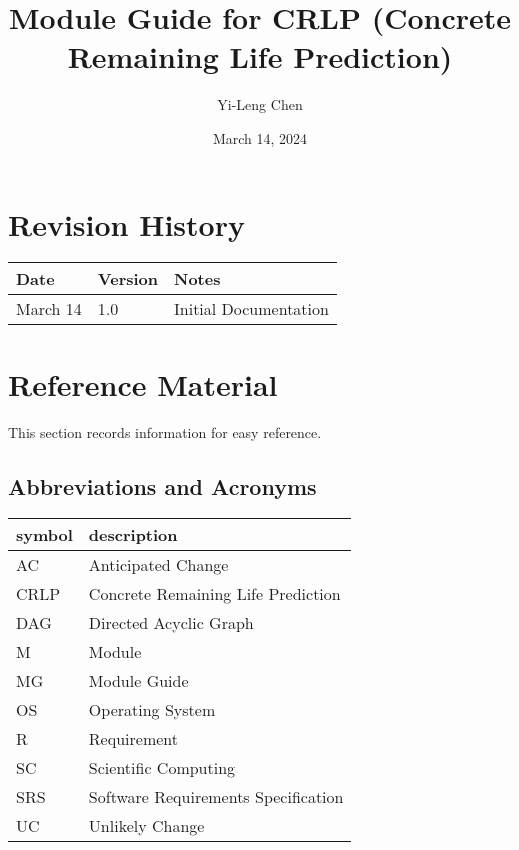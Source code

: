 \documentclass[12pt, titlepage]{article}
\begin{document}
\title{Module Guide for CRLP (Concrete Remaining Life Prediction)}
\author{Yi-Leng Chen}
\date{March 14, 2024}

\maketitle
{}

\section{Revision History}

\begin{tabularx}{\textwidth}{p{3cm}p{2cm}X}
\toprule {\bf Date} & {\bf Version} & {\bf Notes}\\
\midrule
March 14 & 1.0 & Initial Documentation\\
\bottomrule
\end{tabularx}

\newpage

\section{Reference Material}

This section records information for easy reference.

\subsection{Abbreviations and Acronyms}

\renewcommand{\arraystretch}{1.2}
\begin{tabular}{l l} 
  \toprule		
  \textbf{symbol} & \textbf{description}\\
  \midrule 
  AC & Anticipated Change\\
  CRLP & Concrete Remaining Life Prediction \\
  DAG & Directed Acyclic Graph \\
  M & Module \\
  MG & Module Guide \\
  OS & Operating System \\
  R & Requirement\\
  SC & Scientific Computing \\
  SRS & Software Requirements Specification\\
  UC & Unlikely Change \\
  \bottomrule
\end{tabular}\\
\end{document}
